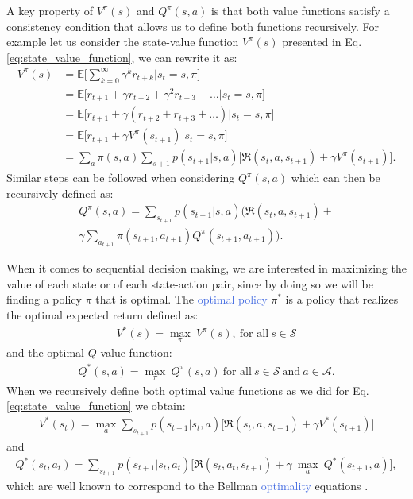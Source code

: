 A key property of $V^{\pi}(s)$ and $Q^{\pi}(s,a)$ is that both value functions satisfy a consistency condition that allows us to define both functions recursively. For example let us consider the state-value function $V^{\pi}(s)$ presented in Eq. \ref{eq:state_value_function}, we can rewrite it as:
\begin{align}
 V^{\pi}(s) & =\mathds{E}\big[\sum_{k=0}^{\infty}\gamma^{k}r_{t+k}\big| s_t = s, \pi \big] \\ 
 & =\mathds{E}\big[r_{t+1}+\gamma r_{t+2}+\gamma^{2}r_{t+3}+\ldots \big| s_t =s , \pi \big] \\ 
 & =\mathds{E}\big[r_{t+1}+\gamma(r_{t+2}+r_{t+3}+\ldots)\big| s_t =s , \pi \big] \\
 & =\mathds{E}\big[r_{t+1}+\gamma V^{\pi}(s_{t+1}) \big| s_t =s , \pi \big] \\
 & =\sum_a \pi(s,a) \sum_{s+1} p(s_{t+1}|s,a)\big[\Re(s_t, a, s_{t+1}) + \gamma V^{\pi}(s_{t+1}) \big].
\end{align}
Similar steps can be followed when considering $Q^{\pi}(s,a)$ which can then be recursively defined as:
\begin{align}
	Q^{\pi}(s,a) = \sum_{s_{t+1}} p(s_{t+1}|s,a)\big(\Re(s_t, a, s_{t+1}) + \\ \gamma \sum_{a_{t+1}} \pi(s_{t+1},a_{t+1}) Q^{\pi}(s_{t+1}, a_{t+1}) \big).
\end{align}

When it comes to sequential decision making, we are interested in maximizing the value of each state or of each state-action pair, since by doing so we will be finding a policy $\pi$ that is optimal. The \textcolor{RoyalBlue}{optimal policy} $\pi^{*}$ is a policy that realizes the optimal expected return defined as:
\begin{align}
 V^{*}(s)=\underset{\pi}{\max}\:V^{\pi}(s), \ \text{for all} \ s\in\mathcal{S}
\end{align}
and the optimal $Q$ value function:
\begin{align}
Q^{*}(s,a)= \underset{\pi}{\max}\:Q^{\pi}(s,a) \ \text{for all} \ s\in\mathcal{S} \ \text{and} \ a \in\mathcal{    A}.
\end{align}
When we recursively define both optimal value functions as we did for Eq. \ref{eq:state_value_function} we obtain:
\begin{align}
    V^{*}(s_t) = \underset{a}{\max}\sum_{s_{t+1}}p(s_{t+1} | s_{t}, a) \bigg[\Re (s_{t}, a, s_{t+1}) + \gamma V^{*}(s_{t+1}) \bigg]
    \label{eq:optimal_v}
\end{align}
and
\begin{multline}
    Q^{*}(s_t,a_t)=\sum_{s_{t+1}}p(s_{t+1} | s_{t}, a_{t})  \bigg[\Re (s_{t}, a_{t}, s_{t+1}) + \gamma \: \underset{a}{\max} \: Q^{*}(s_{t+1}, a) \bigg],
    \label{eq:optimal_q}
\end{multline}
which are well known to correspond to the Bellman \textcolor{RoyalBlue}{optimality} equations \cite{bellman1966dynamic}. 

